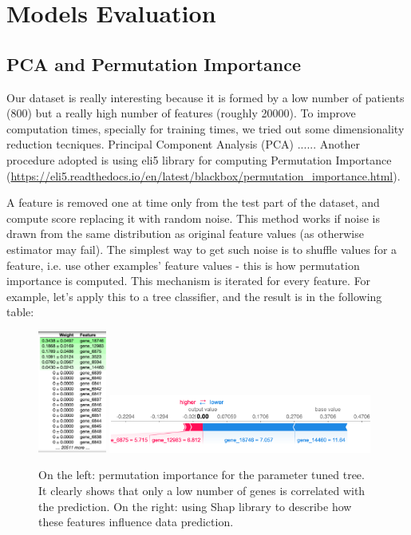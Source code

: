 \documentclass{article}
\begin{document}

\section{Models Evaluation}


\subsection{PCA and Permutation Importance}

Our dataset is really interesting because it is formed by a low number of patients (800) but a really high number of features (roughly 20000). To improve computation times, specially for training times, we tried out some dimensionality reduction tecniques.
Principal Component Analysis (PCA) ......
Another procedure adopted is using eli5 library for computing Permutation Importance (\url{https://eli5.readthedocs.io/en/latest/blackbox/permutation_importance.html}).

A feature is removed one at time only from the test part of the dataset, and compute score replacing it with random noise. This method works if noise is drawn from the same distribution as original feature values (as otherwise estimator may fail). The simplest way to get such noise is to shuffle values for a feature, i.e. use other examples’ feature values - this is how permutation importance is computed.
This mechanism is iterated for every feature. For example, let's apply this to a tree classifier, and the result is in the following table:



\begin{figure}[hbt]
\centering
\includegraphics[width=0.2\textwidth]{img/perm}
\includegraphics[width=0.77\textwidth]{img/shap.png}
\caption{On the left: permutation importance for the parameter tuned tree. It clearly shows that only a low number of genes is correlated with the prediction. On the right: using Shap library to describe how these features influence data prediction.}
\label{fig_perm}
\end{figure}
\end{document}
